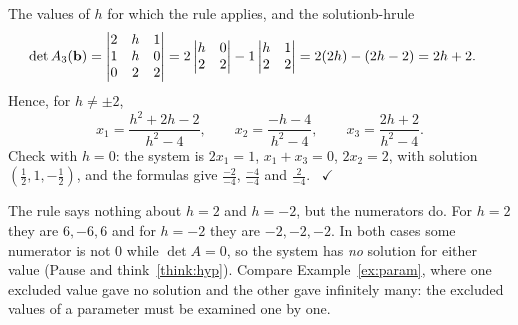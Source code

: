 \documentclass[11pt]{article}
\begin{document}
\begin{exmp}{The values of $h$ for which the rule applies, and the solution}{b-hrule}
\begin{align*}
\det A_3(\mathbf{b})&=\begin{vmatrix}2&h&1\\1&h&0\\0&2&2\end{vmatrix}=2\begin{vmatrix}h&0\\2&2\end{vmatrix}-1\begin{vmatrix}h&1\\2&2\end{vmatrix}=2(2h)-(2h-2)=2h+2.
\end{align*}
Hence, for $h\neq\pm2$,
\[
x_1=\frac{h^2+2h-2}{h^2-4},\qquad x_2=\frac{-h-4}{h^2-4},\qquad x_3=\frac{2h+2}{h^2-4}.
\]
Check with $h=0$: the system is $2x_1=1$, $x_1+x_3=0$, $2x_2=2$, with solution $(\tfrac12,1,-\tfrac12)$, and the formulas give $\frac{-2}{-4}$, $\frac{-4}{-4}$ and $\frac2{-4}$. \ $\checkmark$

The rule says nothing about $h=2$ and $h=-2$, but the numerators do. For $h=2$ they are $6,-6,6$ and for $h=-2$ they are $-2,-2,-2$. In both cases some numerator is not $0$ while $\det A=0$, so the system has \emph{no} solution for either value (Pause and think~\ref{think:hyp}). Compare Example~\ref{ex:param}, where one excluded value gave no solution and the other gave infinitely many: the excluded values of a parameter must be examined one by one.
\end{exmp}
\end{document}
